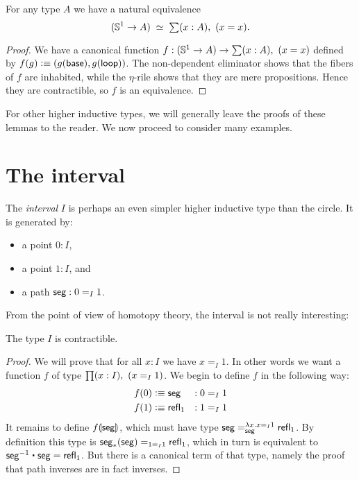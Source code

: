 \begin{lem}
  For any type $A$ we have a natural equivalence
  \[ (\Sn^1 \to A) \;\simeq\;
  \sm{x:A} (x=x).
  \]
\end{lem}
\begin{proof}
  We have a canonical function $f:(\Sn^1 \to A) \to \sm{x:A} (x=x)$ defined by $f(g) \defeq (g(\base),\ap g \lloop)$.
  The non-dependent eliminator shows that the fibers of $f$ are inhabited, while the $\eta$-rile shows that they are mere propositions.
  Hence they are contractible, so $f$ is an equivalence.
\end{proof}

For other higher inductive types, we will generally leave the proofs of these lemmas to the reader.
We now proceed to consider many examples.


\section{The interval}
\label{sec:interval}

The \emph{interval} $I$ is perhaps an even simpler higher inductive type than the circle.
It is generated by:
\begin{itemize}
\item a point $0:I$,
\item a point $1:I$, and
\item a path $\seg : \id[I]01$.
\end{itemize}
From the point of view of homotopy theory, the interval is not really interesting:

\begin{lem}
  The type $I$ is contractible.
\end{lem}

\begin{proof}
  We will prove that for all $x:I$ we have $x=_I1$. In other words we want a
  function $f$ of type $\prd{x:I}(x=_I1)$. We begin to define $f$ in the following way:
  \begin{alignat*}{2}
    f(0)&\defeq \seg  &:0&=_I1\\
    f(1)&\defeq \refl1 &:1 &=_I1
  \end{alignat*}
  It remains to define $\apd{f}\seg$, which must have type $\seg =_\seg^{\lambda{}x.x=_I1}\refl 1$.
  By definition this type is $\trans\seg\seg=_{1=_I1}\refl1$, which in turn is equivalent to $\rev\seg\ct\seg=\refl1$.
  But there is a canonical term of that type, namely the proof that path inverses are in fact inverses.
\end{proof}

